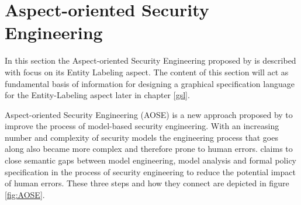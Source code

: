\documentclass[twoside, openright, 12pt]{book}
\begin{document}







\section{Aspect-oriented Security Engineering}
\label{AOSE}
In this section the Aspect-oriented Security Engineering proposed by \cite{Amthor18} is described with focus on its Entity Labeling aspect.
The content of this section will act as fundamental basis of information for designing a graphical specification language for the Entity-Labeling aspect later in chapter \ref{gsl}.

Aspect-oriented Security Engineering (AOSE) is a new approach proposed by \cite{Amthor18} to improve the process of model-based security engineering.
With an increasing number and complexity of security models the engineering process that goes along also became more complex and therefore prone to human errors.
\cite{Amthor18} claims to close semantic gaps between model engineering, model analysis and formal policy specification in the process of security engineering to reduce the potential impact of human errors.
These three steps and how they connect are depicted in figure \ref{fig:AOSE}.
\end{document}
